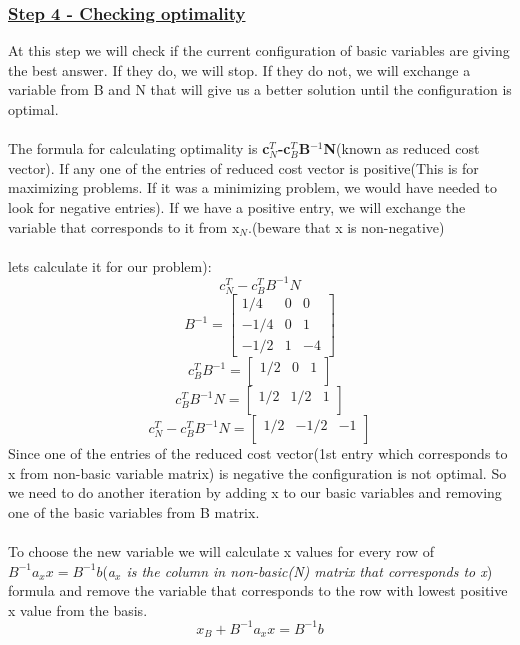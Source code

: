 \subsubsection{\underline{Step 4 - Checking optimality}}
At this step we will check if the current configuration of basic variables are giving the best answer. If they do, we will stop. If they do not, we will exchange a variable from B and N that will give us a better solution until the configuration is optimal.\\
\\
The formula for calculating optimality is \textbf{c$_N^T$-c$_B^T$B$^{-1}$N}(known as reduced cost vector). If any one of the entries of reduced cost vector is positive(This is for maximizing problems. If it was a minimizing problem, we would have needed to look for negative entries). If we have a positive entry, we will exchange the variable that corresponds to it from x$_N$.(beware that x is non-negative)\\
\\
lets calculate it for our problem):\\
\[c_N^T-c_B^TB^{-1}N\]
\[
B^{-1}=
\begin{bmatrix}
1/4  &0&0\\
-1/4 &0&1\\
-1/2 &1&-4
\end{bmatrix}
\]
\[
c_B^TB^{-1}=
\begin{bmatrix}
1/2&0&1\\
\end{bmatrix}
\]
\[
c_B^TB^{-1}N=\begin{bmatrix}
1/2&1/2&1\\
\end{bmatrix}
\]
\[c_N^T-c_B^TB^{-1}N=
\begin{bmatrix}
1/2&-1/2&-1\\
\end{bmatrix}
\]
Since one of the entries of the reduced cost vector(1st entry which corresponds to x from non-basic variable matrix) is negative the configuration is not optimal. So we need to do another iteration by adding x to our basic variables and removing one of the basic variables from B matrix.\\
\\
To choose the new variable we will calculate x values for every row of $B^{-1}a_xx=B^{-1}b$(\textit{a$_x$ is the column in non-basic(N) matrix that corresponds to x}) formula and remove the variable that corresponds to the row with lowest positive x value from the basis. 
\[x_B+B^{-1}a_xx=B^{-1}b\]
